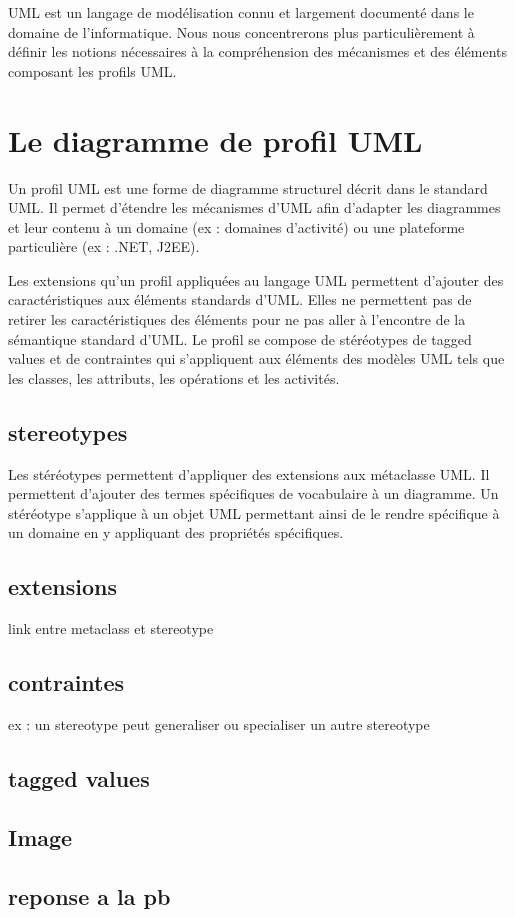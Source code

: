 UML est un langage de modélisation connu et largement documenté dans le domaine de l'informatique.
Nous nous concentrerons plus particulièrement à définir les notions nécessaires à la compréhension des mécanismes et des éléments composant les profils UML.

\section{Le diagramme de profil UML}
Un profil UML est une forme de diagramme structurel décrit dans le standard UML.
Il permet d'étendre les mécanismes d'UML afin d'adapter les diagrammes et leur contenu à un domaine (ex : domaines d'activité) ou une plateforme particulière (ex : .NET, J2EE).

Les extensions qu'un profil appliquées au langage UML permettent d'ajouter des caractéristiques aux éléments standards d'UML.
Elles ne permettent pas de retirer les caractéristiques des éléments pour ne pas aller à l'encontre de la sémantique standard d'UML.
Le profil se compose  de stéréotypes de tagged values et de contraintes qui s'appliquent aux éléments des modèles UML tels que les classes, les attributs, les opérations et les activités.


\subsection{stereotypes}
Les stéréotypes permettent d'appliquer des extensions aux métaclasse UML.
Il permettent d'ajouter des termes spécifiques de vocabulaire à un diagramme.
Un stéréotype s'applique à un objet UML permettant ainsi de le rendre spécifique à un domaine en y appliquant des propriétés spécifiques.

\subsection{extensions}
link entre metaclass et stereotype


\subsection{contraintes}
ex : un stereotype peut generaliser ou specialiser un autre stereotype


\subsection{tagged values}


\subsection{Image}


\subsection{reponse a la pb}
